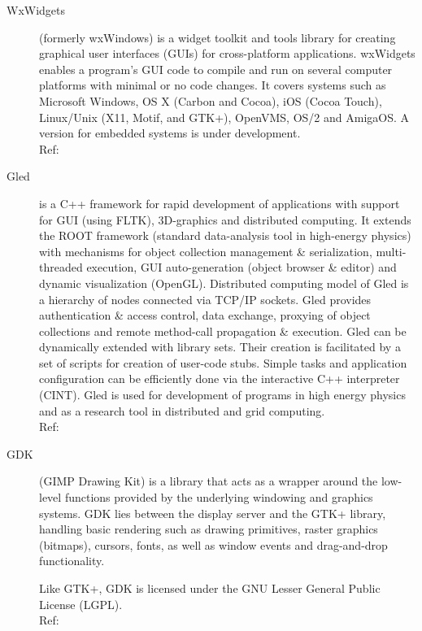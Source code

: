 \begin{description}
    \item[WxWidgets] (formerly wxWindows) is a widget toolkit and tools library
		for creating graphical user interfaces (GUIs) for cross-platform
		applications. wxWidgets enables a program's GUI code to compile
		and run on several computer platforms with minimal or no code
		changes. It covers systems such as Microsoft Windows, OS X
		(Carbon and Cocoa), iOS (Cocoa Touch), Linux/Unix (X11, Motif,
		and GTK+), OpenVMS, OS/2 and AmigaOS. A version for embedded
		systems is under development.
		\hspace*{\fill}\\Ref: \cite{wiki:wxwidget}

	\item[Gled]	is a C++ framework for rapid development of applications with
		support for GUI (using FLTK), 3D-graphics and distributed
		computing. It extends the ROOT framework (standard data-analysis
		tool in high-energy physics) with mechanisms for object collection
		management \& serialization, multi-threaded execution, GUI
		auto-generation (object browser \& editor) and dynamic visualization
		(OpenGL). Distributed computing model of Gled is a hierarchy of
		nodes connected via TCP/IP sockets. Gled provides authentication \&
		access control, data exchange, proxying of object collections and
		remote method-call propagation \& execution. Gled can be dynamically
		extended with library sets. Their creation is facilitated by a set
		of scripts for creation of user-code stubs. Simple tasks and
		application configuration can be efficiently done via the
		interactive C++ interpreter (CINT). Gled is used for development of
		programs in high energy physics and as a research tool in
		distributed and grid computing. 
		\hspace*{\fill}\\Ref: \cite{fltk:gled}

    \item[GDK]  (GIMP Drawing Kit) is a library that acts as a wrapper around
		the low-level functions provided by the underlying windowing
		and graphics systems. GDK lies between the display server and
		the GTK+ library, handling basic rendering such as drawing
		primitives, raster graphics (bitmaps), cursors, fonts, as well
		as window events and drag-and-drop functionality.

		Like GTK+, GDK is licensed under the GNU Lesser General
		Public License (LGPL).
		\hspace*{\fill}\\Ref: \cite{wiki:gdk}
\end{description}

